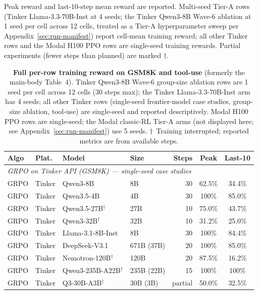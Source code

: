 \documentclass{article}
\begin{document}
Peak reward and last-10-step mean reward are reported. Multi-seed Tier-A
rows (Tinker Llama-3.3-70B-Inst at 4 seeds; the Tinker Qwen3-8B Wave-6
ablation at 1 seed per cell across 12 cells, treated as a Tier-A
hyperparameter sweep per Appendix~\ref{sec:run-manifest}) report cell-mean
training reward; all other Tinker rows and the Modal H100 PPO rows are
single-seed training rewards. Partial experiments (fewer steps than
planned) are marked $\dagger$.

\begin{table}[h]
\centering
\caption{\textbf{Full per-row training reward on GSM8K and tool-use} (formerly
the main-body Table~4). Tinker Qwen3-8B Wave-6 group-size ablation rows are
1 seed per cell across 12 cells (30 steps max); the Tinker Llama-3.3-70B-Inst
arm has 4 seeds; all other Tinker rows
(single-seed frontier-model case studies, group-size ablation, tool-use)
are single-seed and reported descriptively. Modal H100 PPO rows are
single-seed; the Modal classic-RL Tier-A arms (not displayed here; see
Appendix~\ref{sec:run-manifest}) use 5 seeds.
$\dagger$~Training interrupted; reported metrics are from available steps.}
\label{tab:main_results}
\scriptsize
\setlength{\tabcolsep}{3pt}
\begin{tabular}{@{}l l l l r c c@{}}
\toprule
\textbf{Algo} & \textbf{Plat.} & \textbf{Model} & \textbf{Size} & \textbf{Steps} & \textbf{Peak} & \textbf{Last-10} \\
\midrule
\multicolumn{7}{l}{\textit{GRPO on Tinker API (GSM8K) --- single-seed case studies}} \\
\midrule
GRPO & Tinker & Qwen3-8B & 8B & 30 & 62.5\% & 34.4\% \\
GRPO & Tinker & Qwen3.5-4B & 4B & 30 & 100\% & 85.0\% \\
GRPO & Tinker & Qwen3.5-27B$^\dagger$ & 27B & 10 & 75.0\% & 43.7\% \\
GRPO & Tinker & Qwen3-32B$^\dagger$ & 32B & 10 & 31.2\% & 25.0\% \\
GRPO & Tinker & Llama-3.1-8B-Inst & 8B & 30 & 100\% & 84.4\% \\
GRPO & Tinker & DeepSeek-V3.1 & 671B (37B) & 20 & 100\% & 85.0\% \\
GRPO & Tinker & Nemotron-120B$^\dagger$ & 120B & 20 & 87.5\% & 16.2\% \\
GRPO & Tinker & Qwen3-235B-A22B$^\dagger$ & 235B (22B) & 15 & 100\% & 100\% \\
GRPO & Tinker & Q3-30B-A3B$^\dagger$ & 30B (3B) & partial & 50.0\% & 32.5\% \\

\end{tabular}
\end{table}
\end{document}
